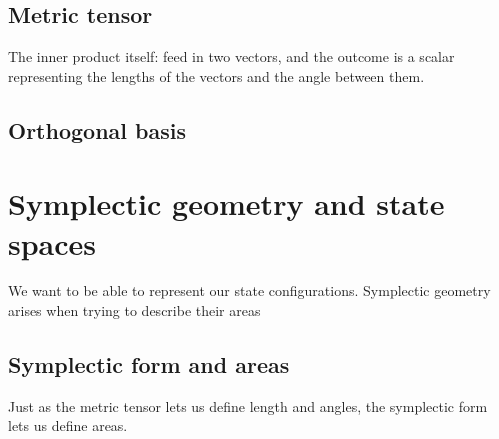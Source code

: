 \documentclass{book}
\begin{document}
\subsection{Metric tensor}
The inner product itself: feed in two vectors, and the outcome is a scalar representing the lengths of the vectors and the angle between them. 
\subsection{Orthogonal basis}

\section{Symplectic geometry and state spaces}
We want to be able to represent our state configurations. Symplectic geometry arises when trying to describe their areas

\subsection{Symplectic form and areas}
Just as the metric tensor lets us define length and angles, the symplectic form lets us define areas. 
\end{document}
